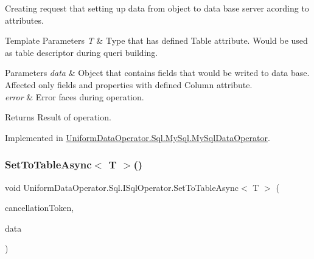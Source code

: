 Creating request that setting up data from object to data base server acording to attributes. 


\begin{DoxyTemplParams}{Template Parameters}
{\em T} & Type that has defined Table attribute. Would be used as table descriptor during queri building.\\
\hline
\end{DoxyTemplParams}

\begin{DoxyParams}{Parameters}
{\em data} & Object that contains fields that would be writed to data base. Affected only fields and properties with defined Column attribute.\\
\hline
{\em error} & Error faces during operation.\\
\hline
\end{DoxyParams}
\begin{DoxyReturn}{Returns}
Result of operation.
\end{DoxyReturn}


Implemented in \mbox{\hyperlink{class_uniform_data_operator_1_1_sql_1_1_my_sql_1_1_my_sql_data_operator_ac1bee965fd57e9b2949c09a6b72a9e3e}{Uniform\+Data\+Operator.\+Sql.\+My\+Sql.\+My\+Sql\+Data\+Operator}}.

\mbox{\label{interface_uniform_data_operator_1_1_sql_1_1_i_sql_operator_af43c4421b85e52d180763871be8147f6}} 
\subsubsection{\texorpdfstring{Set\+To\+Table\+Async$<$ T $>$()}{SetToTableAsync< T >()}}
{\footnotesize\ttfamily void Uniform\+Data\+Operator.\+Sql.\+I\+Sql\+Operator.\+Set\+To\+Table\+Async$<$ T $>$ (\begin{DoxyParamCaption}\item[{Cancellation\+Token}]{cancellation\+Token,  }\item[{object}]{data }\end{DoxyParamCaption})}



